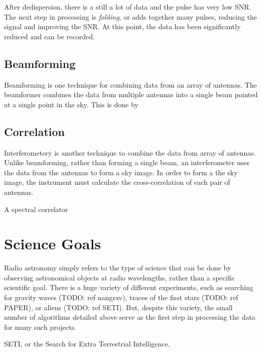 After dedispersion, there is a still a lot of data and the pulse has very low SNR. 
The next step in processing is \emph{folding}, or adds together many pulses, reducing the signal and improving the SNR.
At this point, the data has been significantly reduced and can be recorded. 


%
\subsection{Beamforming}
Beamforming is one technique for combining data from an array of antennas.
The beamformer combines the data from multiple antennas into a single beam pointed at a single point in the sky.
This is done by 

\subsection{Correlation}
Interferometery is another technique to combine the data from array of antennas.
Unlike beamforming, rather than forming a single beam, an interferometer uses the data from the antennas to form a sky image. 
In order to form a the sky image, the instrument must calculate the cross-correlation of each pair of antennas.

A spectral correlator


\section{Science Goals}
Radio astronomy simply refers to the type of science that can be done by observing astronomical objects at radio wavelengths, rather than a specific scientific goal. 
There is a huge variety of different experiments, such as searching for gravity waves (TODO: ref nangrav), traces of the first stars (TODO: ref PAPER), or aliens (TODO: ref SETI).
But, despite this variety, the small number of algorithms detailed above serve as the first step in processing the data for many such projects.

SETI, or the Search for Extra Terrestrial Intelligence, 

